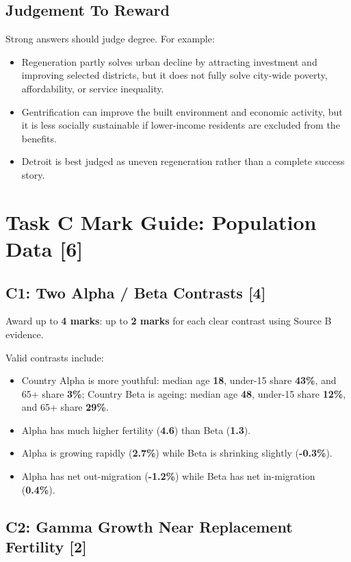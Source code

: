 \documentclass[11pt,a4paper]{article}
\newcommand{\term}[1]{\textcolor{HeadingBlue}{\textbf{#1}}}
\newcommand{\score}[1]{\textcolor{AccentTeal}{\textbf{#1}}}
\begin{document}
\subsection{Judgement To Reward}

Strong answers should judge degree. For example:

\begin{itemize}
  \item Regeneration partly solves urban decline by attracting investment and
  improving selected districts, but it does not fully solve city-wide poverty,
  affordability, or service inequality.
  \item Gentrification can improve the built environment and economic activity,
  but it is less socially sustainable if lower-income residents are excluded
  from the benefits.
  \item Detroit is best judged as uneven regeneration rather than a complete
  success story.
\end{itemize}

\section{Task C Mark Guide: Population Data [6]}

\subsection{C1: Two Alpha / Beta Contrasts [4]}

Award up to \score{4 marks}: up to \score{2 marks} for each clear contrast
using Source B evidence.

Valid contrasts include:

\begin{itemize}
  \item Country Alpha is more youthful: median age \term{18}, under-15 share
  \term{43\%}, and 65+ share \term{3\%}; Country Beta is ageing: median age
  \term{48}, under-15 share \term{12\%}, and 65+ share \term{29\%}.
  \item Alpha has much higher fertility (\term{4.6}) than Beta (\term{1.3}).
  \item Alpha is growing rapidly (\term{2.7\%}) while Beta is shrinking
  slightly (\term{-0.3\%}).
  \item Alpha has net out-migration (\term{-1.2\%}) while Beta has net
  in-migration (\term{0.4\%}).
\end{itemize}

\subsection{C2: Gamma Growth Near Replacement Fertility [2]}
\end{document}
